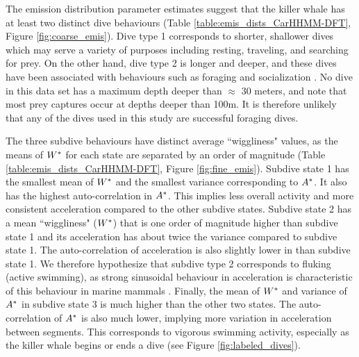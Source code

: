 The emission distribution parameter estimates suggest that the killer whale has at least two distinct dive behaviours (Table \ref{table:emis_dists_CarHHMM-DFT}, Figure \ref{fig:coarse_emis}). 
Dive type 1 corresponds to shorter, shallower dives which may serve a variety of purposes including resting, traveling, and searching for prey.
On the other hand, dive type 2 is longer and deeper, and these dives have been associated with behaviours such as foraging and socialization \citep{Tennessen:2019b}. No dive in this data set has a maximum depth deeper than $\approx$ 30 meters, and \citet{Wright:2017} note that most prey captures occur at depths deeper than 100m. It is therefore unlikely that any of the dives used in this study are successful foraging dives.

The three subdive behaviours have distinct average ``wiggliness" values, as the means of $W^*$ for each state are separated by an order of magnitude (Table \ref{table:emis_dists_CarHHMM-DFT}, Figure \ref{fig:fine_emis}). 
Subdive state 1 has the smallest mean of $W^*$ and the smallest variance corresponding to $A^*$. It also has the highest auto-correlation in $A^*$. This implies less overall activity and more consistent acceleration compared to the other subdive states. 
Subdive state 2 has a mean ``wiggliness" ($W^*$) that is one order of magnitude higher than subdive state 1 and its acceleration has about twice the variance compared to subdive state 1. The auto-correlation of acceleration is also slightly lower in than subdive state 1. We therefore hypothesize that subdive type 2 corresponds to fluking (active swimming), as strong sinusoidal behaviour in acceleration is characteristic of this behaviour in marine mammals \citep{Simon:2012}.
Finally, the mean of $W^*$ and variance of $A^*$ in subdive state 3 is much higher than the other two states. The auto-correlation of $A^*$ is also much lower, implying more variation in acceleration between segments. This corresponds to vigorous swimming activity, especially as the killer whale begins or ends a dive (see Figure \ref{fig:labeled_dives}). 

